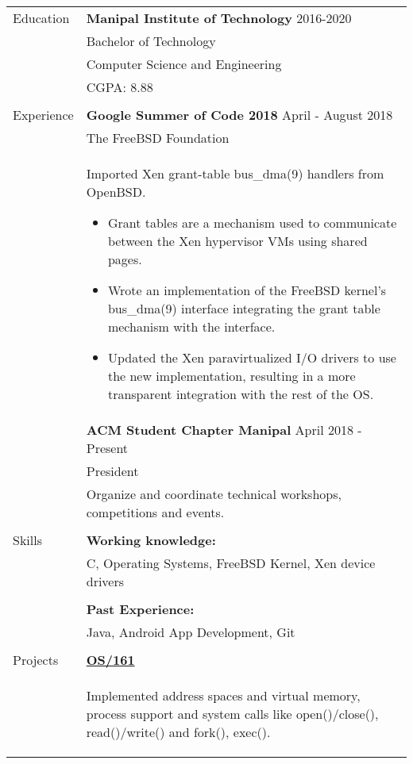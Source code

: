 \documentclass[letterpaper,11pt,oneside]{article}
\begin{document}
\noindent \begin{tabularx}{\textwidth}{l X}
 \Large{Education} & \textbf{Manipal Institute of Technology} \hfill 2016-2020  \\
     & Bachelor of Technology \\
     & Computer Science and Engineering \\
     &  CGPA: 8.88\\
     & \\
 \Large{Experience}    & \textbf{Google Summer of Code 2018} \hfill April - August 2018 \\
    & The FreeBSD Foundation \\
    & Imported Xen grant-table bus\_dma(9) handlers from OpenBSD. \vspace{-1ex}
    \begin{itemize}[label={--}]
    \setlength\itemsep{-0.25em}
        \item Grant tables are a mechanism used to communicate between the Xen hypervisor VMs using shared pages.
        \item Wrote an implementation of the FreeBSD kernel's bus\_dma(9) interface integrating the grant table mechanism with the interface.
        \item Updated the Xen paravirtualized I/O drivers to use the new implementation, resulting in a more transparent integration with the rest of the OS.
    \end{itemize} \\
    & \textbf{ACM Student Chapter Manipal} \hfill April 2018 -  Present \\
    & President \\
    & Organize and coordinate technical workshops, competitions and events. \\
    & \\
 \Large{Skills} & \textbf{Working knowledge:} \\
    & C, Operating Systems, FreeBSD Kernel, Xen device drivers \\
    & \\
    & \textbf{Past Experience:} \\
    & Java, Android App Development, Git \\
    & \\
 \Large{Projects} \vspace{-1.5ex} & \textbf{\href{https://github.com/prati0100/OS161}{OS/161}} \\
    \vspace{-3ex} & \begin{adjustwidth}{}{}Implemented address spaces and virtual memory, process support and system calls like open()/close(), read()/write() and fork(), exec().\end{adjustwidth} \\

\end{tabularx}
\end{document}
